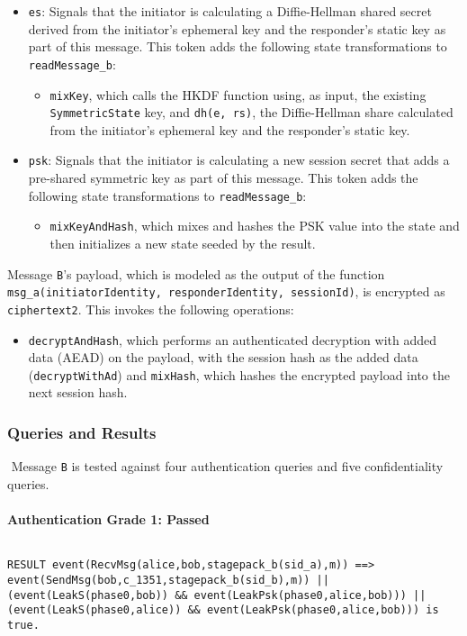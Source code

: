 \begin{itemize}
\item \texttt{es}: Signals that the initiator is calculating a Diffie-Hellman shared secret derived from the initiator's ephemeral key and the responder's static key as part of this message. This token adds the following state transformations to \texttt{readMessage\_b}:
\begin{itemize}

\item \texttt{mixKey}, which calls the HKDF function using, as input, the existing \texttt{SymmetricState} key, and \texttt{dh(e, rs)}, the Diffie-Hellman share calculated from the initiator's ephemeral key and the responder's static key.
\end{itemize}


\item \texttt{psk}: Signals that the initiator is calculating a new session secret that adds a pre-shared symmetric key as part of this message. This token adds the following state transformations to \texttt{readMessage\_b}:
\begin{itemize}

\item  \texttt{mixKeyAndHash}, which mixes and hashes the PSK value into the state and then initializes a new state seeded by the result.
\end{itemize}


\end{itemize}
Message \texttt{B}'s payload, which is modeled as the output of the function \texttt{msg\_a(initiatorIdentity, responderIdentity, sessionId)}, is encrypted as \texttt{ciphertext2}. This invokes the following operations:


\begin{itemize}

\item \texttt{decryptAndHash}, which performs an authenticated decryption with added data (AEAD) on the payload, with the session hash as the added data (\texttt{decryptWithAd}) and \texttt{mixHash}, which hashes the encrypted payload into the next session hash.

\end{itemize}
\subsubsection{Queries and Results}$ $
Message \texttt{B} is tested against four authentication queries and five confidentiality queries.
\paragraph{Authentication Grade 1: Passed}$ $
\begin{lstlisting}
RESULT event(RecvMsg(alice,bob,stagepack_b(sid_a),m)) ==> event(SendMsg(bob,c_1351,stagepack_b(sid_b),m)) || (event(LeakS(phase0,bob)) && event(LeakPsk(phase0,alice,bob))) || (event(LeakS(phase0,alice)) && event(LeakPsk(phase0,alice,bob))) is true.
\end{lstlisting}

